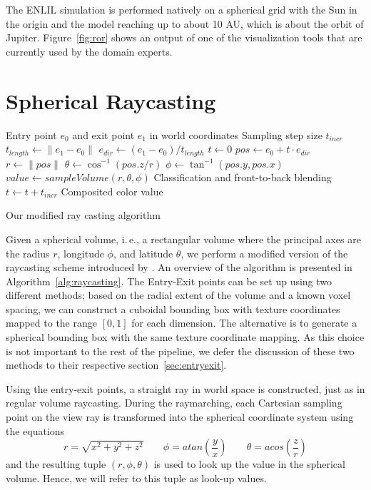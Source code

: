 \documentclass{egpubl}
\begin{document}
The ENLIL simulation is performed natively on a spherical grid with the Sun in the origin and the model reaching up to about 10 AU, which is about the orbit of Jupiter. Figure~\ref{fig:ror} shows an output of one of the visualization tools that are currently used by the domain experts.

\section{Spherical Raycasting}
\label{sec:spherical}
\begin{algorithm}
\begin{algorithmic}[1]
\REQUIRE Entry point $e_0$ and exit point $e_1$ in world coordinates
\REQUIRE Sampling step size $t_{incr}$
\STATE $t_{length} \gets \| e_1 - e_0 \|$
\STATE $e_{dir} \gets \left( e_1 - e_0 \right) / t_{length}$
\STATE $t \gets 0$
	\STATE $pos \gets e_0 + t \cdot e_{dir}$
	\STATE $r \gets \| pos \|$
	\STATE $\theta \gets \cos^{-1}(pos.z / r)$
	\STATE $\phi \gets \tan^{-1}(pos.y, pos.x)$
	\STATE $value \gets sampleVolume(r, \theta , \phi)$
	\STATE Classification and front-to-back blending
	\STATE $t \gets t + t_{incr}$
\ENDWHILE
\ENSURE Composited color value

\end{algorithmic}
\caption{Our modified ray casting algorithm}
\label{alg:raycasting}
\end{algorithm}

Given a spherical volume, i.\,e., a rectangular volume where the principal axes are the radius $r$, longitude $\phi$, and latitude $\theta$, we perform a modified version of the raycasting scheme introduced by \cite{Kr}. An overview of the algorithm is presented in Algorithm~\ref{alg:raycasting}. The Entry-Exit points can be set up using two different methods; based on the radial extent of the volume and a known voxel spacing, we can construct a cuboidal bounding box with texture coordinates mapped to the range $[0,1]$ for each dimension. The alternative is to generate a spherical bounding box with the same texture coordinate mapping. As this choice is not important to the rest of the pipeline, we defer the discussion of these two methods to their respective section~\ref{sec:entryexit}.

Using the entry-exit points, a straight ray in world space is constructed, just as in regular volume raycasting. During the raymarching, each Cartesian sampling point on the view ray is transformed into the spherical coordinate system using the equations
$$r = \sqrt{x^2 + y^2 + z^2} \; \; \; \; \; \; \; \phi = atan\left(\frac{y}{x}\right) \; \; \; \; \; \; \; \theta = acos\left(\frac{z}{r}\right)$$
and the resulting tuple $(r, \phi, \theta)$ is used to look up the value in the spherical volume. Hence, we will refer to this tuple as look-up values.
\end{document}
